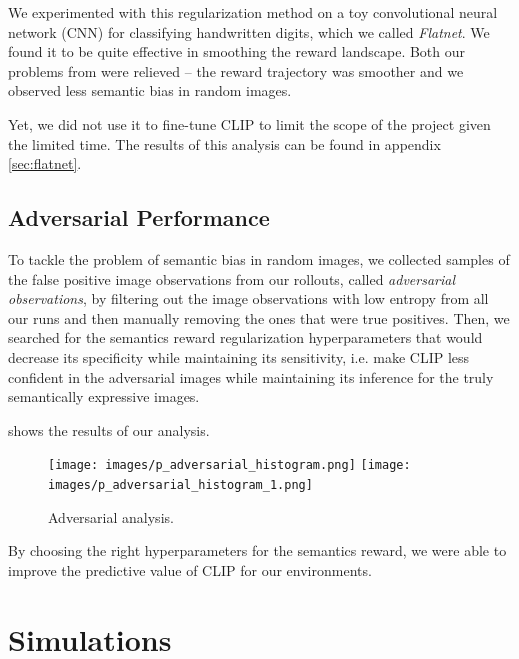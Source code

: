 We experimented with this regularization method on a toy convolutional neural network (CNN) for classifying handwritten digits, which we called \emph{Flatnet}.
We found it to be quite effective in smoothing the reward landscape.
Both our problems from  were relieved -- the reward trajectory was smoother and we observed less semantic bias in random images.

Yet, we did not use it to fine-tune CLIP to limit the scope of the project given the limited time.
The results of this analysis can be found in appendix \ref{sec:flatnet}.

\subsection{Adversarial Performance}
\label{sec:adversarial-performance}
To tackle the problem of semantic bias in random images, we collected samples of the false positive image observations from our rollouts, called \emph{adversarial observations}, by filtering out the image observations with low entropy from all our runs and then manually removing the ones that were true positives.
Then, we searched for the semantics reward regularization hyperparameters that would decrease its specificity while maintaining its sensitivity, i.e. make CLIP less confident in the adversarial images while maintaining its inference for the truly semantically expressive images.

 shows the results of our analysis.
\begin{figure}[H]
    \centering
    \texttt{[image: images/p\_adversarial\_histogram.png]}
    \texttt{[image: images/p\_adversarial\_histogram\_1.png]}
    \caption{Adversarial analysis.}
    \label{fig:adversarial-images}
\end{figure}

By choosing the right hyperparameters for the semantics reward, we were able to improve the predictive value of CLIP for our environments.

\newpage
\section{Simulations}
\label{sec:simulations}


